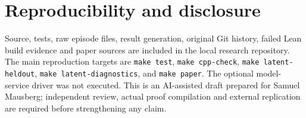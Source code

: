 \documentclass[10pt,twocolumn]{article}
\begin{document}
\section*{Reproducibility and disclosure}
Source, tests, raw episode files, result generation, original Git history,
failed Lean build evidence and paper sources are included in the local research
repository. The main reproduction targets are \texttt{make test},
\texttt{make cpp-check}, \texttt{make latent-heldout},
\texttt{make latent-diagnostics}, and \texttt{make paper}.
The optional model-service driver was not executed. This is an AI-assisted draft
prepared for Samuel Mausberg; independent review, actual proof compilation and
external replication are required before strengthening any claim.


\end{document}
